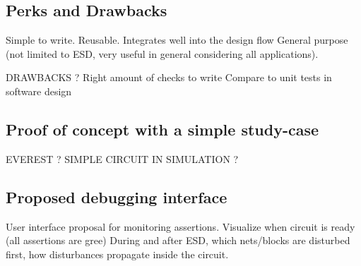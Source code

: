 \subsection{Perks and Drawbacks}

Simple to write.
Reusable.
Integrates well into the design flow
General purpose (not limited to ESD, very useful in general considering all applications).

DRAWBACKS ?
Right amount of checks to write
Compare to unit tests in software design

\subsection{Proof of concept with a simple study-case}

EVEREST ?
SIMPLE CIRCUIT IN SIMULATION ?

\subsection{Proposed debugging interface}

User interface proposal for monitoring assertions.
Visualize when circuit is ready (all assertions are gree)
During and after ESD, which nets/blocks are disturbed first, how disturbances propagate inside the circuit.
